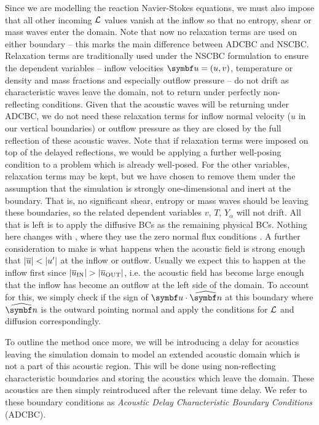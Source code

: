 Since we are modelling the reaction Navier-Stokes equations, we must also impose that all other incoming $\mathcal{L}$ values vanish at the inflow so that no entropy, shear or mass waves enter the domain. Note that now no relaxation terms are used on either boundary -- this marks the main difference between ADCBC and NSCBC. Relaxation terms are traditionally used under the NSCBC formulation to ensure the dependent variables -- inflow velocities $\vb{u}=(u, v)$, temperature or density and mass fractions and especially outflow pressure -- do not drift as characteristic waves leave the domain, not to return under perfectly non-reflecting conditions. Given that the acoustic waves will be returning under ADCBC, we do not need these relaxation terms for inflow normal velocity ($u$ in our vertical boundaries) or outflow pressure as they are closed by the full reflection of these acoustic waves. Note that if relaxation terms were imposed on top of the delayed reflections, we would be applying a further well-posing condition to a problem which is already well-posed. For the other variables, relaxation terms may be kept, but we have chosen to remove them under the assumption that the simulation is strongly one-dimensional and inert at the boundary. That is, no significant shear, entropy or mass waves should be leaving these boundaries, so the related dependent variables $v$, $T$, $Y_α$ will not drift. All that is left is to apply the diffusive BCs as the remaining physical BCs. Nothing here changes with \cite{sutherland2003ImprovedBoundaryConditions}, where they use the zero normal flux conditions . A further consideration to make is what happens when the acoustic field is strong enough that $\abs{\overline{u}} < \abs{u'}$ at the inflow or outflow. Usually we expect this to happen at the inflow first since $\abs{\overline{u}_{\mathrm{IN}}} > \abs{\overline{u}_{\mathrm{OUT}}}$, i.e. the acoustic field has become large enough that the inflow has become an outflow at the left side of the domain. To account for this, we simply check if the sign of $\vb{u}\cdot\uvec{n}$ at this boundary where $\uvec{n}$ is the outward pointing normal and apply the conditions for $\mathcal{L}$ and diffusion correspondingly.

To outline the method once more, we will be introducing a delay for acoustics leaving the simulation domain to model an extended acoustic domain which is not a part of this acoustic region. This will be done using non-reflecting characteristic boundaries and storing the acoustics which leave the domain. These acoustics are then simply reintroduced after the relevant time delay. We refer to these boundary conditions as \emph{Acoustic Delay Characteristic Boundary Conditions} (ADCBC).

